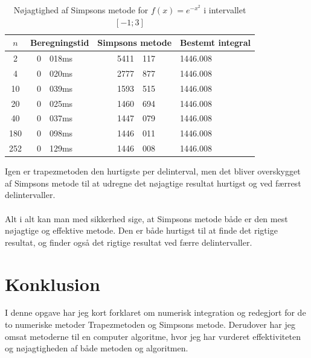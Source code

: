 \documentclass[12pt]{article}
\numberwithin{equation}{section}
\begin{document}
\begin{table}[H]
	\caption {Nøjagtighed af Simpsons metode for $f(x)=e^{-x^2}$ i intervallet $[-1;3]$} 
	\label{tab:simpsonsmetodeex2}
	\begin{center}
		\begin{tabular}{|c|r@{.}l|r @{.} l|l|}
			\hline $n$ & \multicolumn{2}{|c|}{Beregningstid} & \multicolumn{2}{|c|}{Simpsons metode} & Bestemt integral
			\\ 
			\hline 2 & 0&018ms & 5411&117 & 1446.008\\ 
			\hline 4 & 0&020ms & 2777&877 & 1446.008\\ 
			\hline 10 & 0&039ms & 1593&515 & 1446.008\\ 
			\hline 20 & 0&025ms & 1460&694 & 1446.008\\ 
			\hline 40 & 0&037ms & 1447&079 & 1446.008\\ 
			\hline 180 & 0&098ms & 1446&011 & 1446.008\\
			\hline 252 & 0&129ms & 1446&008 & 1446.008\\
			\hline 
		\end{tabular}
	\end{center}
\end{table}
Igen er trapezmetoden den hurtigste per delinterval, men det bliver overskygget af Simpsons metode til at udregne det nøjagtige resultat hurtigst og ved færrest delintervaller.
\\\\
Alt i alt kan man med sikkerhed sige, at Simpsons metode både er den mest nøjagtige og effektive metode. Den er både hurtigst til at finde det rigtige resultat, og finder også det rigtige resultat ved færre delintervaller.

\section{Konklusion}
I denne opgave har jeg kort forklaret om numerisk integration og redegjort for de to numeriske metoder Trapezmetoden og Simpsons metode. Derudover har jeg omsat metoderne til en computer algoritme, hvor jeg har vurderet effektiviteten og nøjagtigheden af både metoden og algoritmen.

\clearpage
\end{document}
